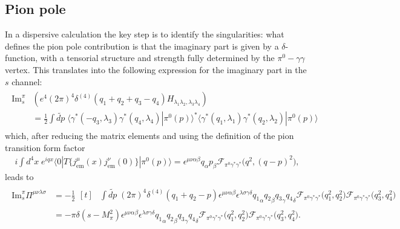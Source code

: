 \documentclass[epj]{webofc}
\renewcommand{\Im}{\mathrm{Im}}
\newcommand{\<}{\langle}
\renewcommand{\>}{\rangle}
\begin{document}
\subsection{Pion pole}\label{pionpole}
In a dispersive calculation the key step is to identify the singularities:
what defines the pion pole contribution is that the imaginary part is given
by a $\delta$-function, with a tensorial structure and strength fully
determined by the $\pi^0-\gamma \gamma$ vertex. This translates into the
following expression for the imaginary part in the $s$ channel:
\begin{align}
	\begin{split}
		\Im_s^\pi &\left( e^4 (2\pi)^4 \delta^{(4)}(q_1 + q_2 + q_3 - q_4) H_{\lambda_1\lambda_2,\lambda_3\lambda_4} \right) \\
			&= \frac{1}{2} \int \widetilde{dp} \; \< \gamma^*(-q_3,\lambda_3) \gamma^*(q_4,\lambda_4) | \pi^0(p) \>^* \< \gamma^*(q_1,\lambda_1) \gamma^*(q_2,\lambda_2) | \pi^0(p) \> 
	\end{split}
\end{align}
which, after reducing the matrix elements and using the definition of the
pion transition form factor 
\begin{align}
	i \int d^4x \; e^{i q x} \< 0 | T \{ j^\mu_\mathrm{em}(x) j^\nu_\mathrm{em}(0) \} | \pi^0(p) \> = \epsilon^{\mu\nu\alpha\beta} q_\alpha p_\beta \mathcal{F}_{\pi^0\gamma^*\gamma^*}\big(q^2, (q-p)^2\big) ,
\end{align}
leads to
\begin{align}
	\begin{split}
		\Im_s^\pi \Pi^{\mu\nu\lambda\sigma} &= - \frac{1}{2} \begin{aligned}[t]
				& \int \widetilde{dp} \; (2\pi)^4
                  \delta^{(4)}(q_1+q_2-p) \epsilon^{\mu\nu\alpha\beta}
                  \epsilon^{\lambda\sigma\gamma\delta} {q_1}_\alpha
                          {q_2}_\beta {q_3}_\gamma {q_4}_\delta
                          \mathcal{F}_{\pi^0\gamma^*\gamma^*}\big(q_1^2,q_2^2\big)
                          \mathcal{F}_{\pi^0\gamma^*\gamma^*}\big(q_3^2,q_4^2\big) \end{aligned}
                \\ 
			&= - \pi \delta( s - M_\pi^2 ) \epsilon^{\mu\nu\alpha\beta} \epsilon^{\lambda\sigma\gamma\delta} {q_1}_\alpha {q_2}_\beta {q_3}_\gamma {q_4}_\delta \mathcal{F}_{\pi^0\gamma^*\gamma^*}\big(q_1^2,q_2^2\big) \mathcal{F}_{\pi^0\gamma^*\gamma^*}\big(q_3^2,q_4^2\big) .
	\end{split}
\end{align}
\end{document}
